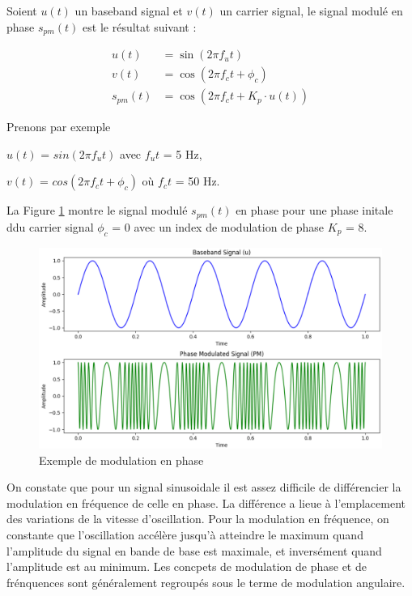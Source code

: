 Soient $u(t)$ un baseband signal et $v(t)$ un carrier signal, le signal modulé en phase $s_{pm}(t)$ est le résultat suivant :

\begin{align}
    u(t) &= \sin(2\pi f_{u}t) \\
    v(t) &= \cos(2\pi f_{c}t + \phi_{c}) \\
    s_{pm}(t) &= \cos\left(2\pi f_{c}t + K_{p} \cdot u(t)\right)
\end{align}

\vspace{0.1cm}

Prenons par exemple

\vspace{0.1cm}

$u(t)$ = $sin(2\pi f_{u}t)$ avec $f_{u}t$ = 5 Hz,

$v(t)$ = $cos(2\pi f_{c}t + \phi_{c})$ où $f_{c}t$ = 50 Hz.

\vspace{0.1cm}

La Figure \ref{term3} montre le signal modulé $s_{pm}(t)$ en phase pour une phase initale ddu carrier signal $\phi_{c}$ = 0 avec un index de modulation de phase $K_{p}$ = 8.

\newpage

\begin{figure}[h]
\centering

\includegraphics[scale=0.5]{images/PM_mod.PNG}
\caption{Exemple de modulation en phase}\label{term3}
\end{figure}

On constate que pour un signal sinusoidale il est assez difficile de différencier la modulation en fréquence de celle en phase. La différence a lieue à l'emplacement des variations de la vitesse d'oscillation. Pour la modulation en fréquence, on constante que l'oscillation accélère jusqu'à atteindre le maximum quand l'amplitude du signal en bande de base est maximale, et inversément quand l'amplitude est au minimum. Les concpets de modulation de phase et de frénquences sont généralement regroupés sous le terme de modulation angulaire.


